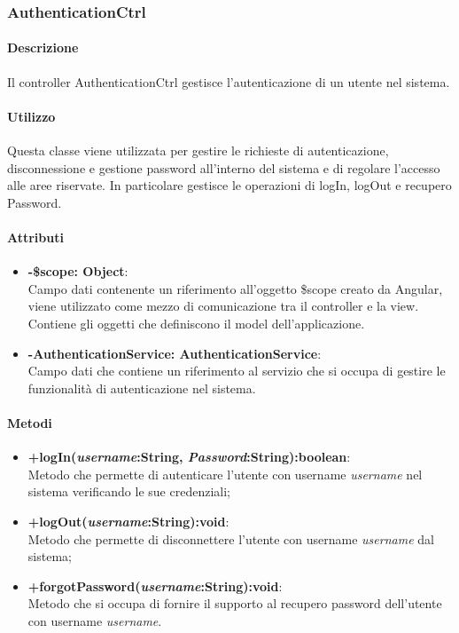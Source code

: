 \subsubsection{AuthenticationCtrl}	
\paragraph{Descrizione}
	Il controller AuthenticationCtrl gestisce l'autenticazione di un utente nel sistema.
	
	\paragraph{Utilizzo}
	Questa classe viene utilizzata per gestire le richieste di autenticazione, disconnessione e gestione password all'interno del sistema e di regolare l'accesso alle aree riservate.
	In particolare gestisce le operazioni di logIn, logOut e recupero Password.
	\paragraph{Attributi}
	\begin{itemize}
		\item \textbf{-\$scope: Object}:\\
			Campo dati contenente un riferimento all'oggetto \$scope creato da Angular, viene utilizzato come mezzo di comunicazione tra il controller e la view. Contiene gli oggetti che definiscono il model dell'applicazione.
		\item \textbf{-AuthenticationService: AuthenticationService}:\\
			Campo dati che contiene un riferimento al servizio che si occupa di gestire le funzionalità di autenticazione nel sistema.
	\end{itemize}
	
	\paragraph{Metodi}
	\begin{itemize}
	  \item \textbf{+logIn(\textit{username}:String, \textit{Password}:String):boolean}:\\
		 Metodo che permette di autenticare l'utente con username \textit{username} nel sistema verificando le sue credenziali;
	  \item \textbf{+logOut(\textit{username}:String):void}:\\
		  Metodo che permette di disconnettere l'utente con username \textit{username} dal sistema;
	  \item \textbf{+forgotPassword(\textit{username}:String):void}:\\
		  Metodo che si occupa di fornire il supporto al recupero password dell'utente con username \textit{username}.
	\end{itemize}

